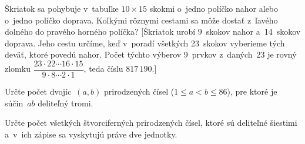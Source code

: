 {Škriatok sa pohybuje v~tabuľke $10\times 15$ skokmi o~jedno políčko
nahor alebo o~jedno políčko doprava. Koľkými rôznymi cestami sa môže dostať z~ľavého
dolného do pravého horného políčka? [Škriatok urobí 9~skokov nahor
a~14~skokov doprava. Jeho cestu určíme, keď v~poradí
všetkých 23~skokov vyberieme tých deväť, ktoré povedú nahor.
Počet týchto výberov 9~prvkov z~daných~23 je rovný zlomku
$\dfrac{23\cdot22\cdots16\cdot15}{9\cdot8\cdots2\cdot1}$, teda
číslu $817\,190$.]

\D
Určte počet dvojíc~$(a,b)$ prirodzených čísel ($1\le a<b\le86$), pre ktoré je
súčin~$ab$ deliteľný tromi.
\vpravo{[C--51--II--1]}

Určte počet všetkých štvorciferných prirodzených čísel, ktoré sú deliteľné šiestimi a~v~ich zápise sa vyskytujú práve dve jednotky.
\vpravo{[C--56--S--1]}
}

